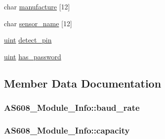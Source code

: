 \begin{DoxyCompactItemize}
\item 
char \hyperlink{struct_a_s608___module___info_aea7413805090b7986a25f5df7eacbbad}{manufacture} \mbox{[}12\mbox{]}
\item 
char \hyperlink{struct_a_s608___module___info_af759a7036827579b15391f8661c86278}{sensor\+\_\+name} \mbox{[}12\mbox{]}
\item 
\hyperlink{as608_8h_a91ad9478d81a7aaf2593e8d9c3d06a14}{uint} \hyperlink{struct_a_s608___module___info_aacc9cf7ae2d65e95f537eafe420f7cd0}{detect\+\_\+pin}
\item 
\hyperlink{as608_8h_a91ad9478d81a7aaf2593e8d9c3d06a14}{uint} \hyperlink{struct_a_s608___module___info_a0fdbc2c11983db5b9007005be490be89}{has\+\_\+password}
\end{DoxyCompactItemize}


\subsection{Member Data Documentation}
\hypertarget{struct_a_s608___module___info_ab605bb8a774c8e3e2557ce31b0637bf3}{}
\subsubsection[{baud\+\_\+rate}]{ A\+S608\+\_\+\+Module\+\_\+\+Info\+::baud\+\_\+rate}\label{struct_a_s608___module___info_ab605bb8a774c8e3e2557ce31b0637bf3}
\hypertarget{struct_a_s608___module___info_a3f5943e11898aee4cc8bc4a1eece27bd}{}
\subsubsection[{capacity}]{ A\+S608\+\_\+\+Module\+\_\+\+Info\+::capacity}\label{struct_a_s608___module___info_a3f5943e11898aee4cc8bc4a1eece27bd}
\hypertarget{struct_a_s608___module___info_a7b0ca4673c3fffc7ffd18beeca2601b0}{}

